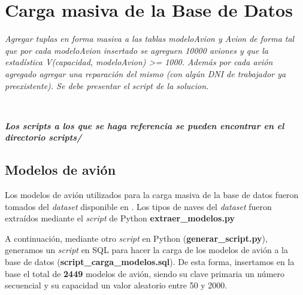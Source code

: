 







\clearpage
\tableofcontents
\clearpage


\section{Carga masiva de la Base de Datos}

\emph{Agregar tuplas en forma masiva a las tablas modeloAvion y Avion de forma tal que por cada modeloAvion insertado se agreguen 10000 aviones y que la estadística V(capacidad, modeloAvion) >= 1000. Además por cada avión agregado agregar una reparación del mismo (con algún DNI de trabajador ya preexistente). Se debe presentar el script de la solucion.} 

~

\emph{\textbf{Los scripts a los que se haga referencia se pueden encontrar en el directorio scripts/}} 

\subsection{Modelos de avión}

Los modelos de avión utilizados para la carga masiva de la base de datos fueron tomados del \emph{dataset} disponible en \cite{dataset:2013}. Los tipos de naves del \emph{dataset} fueron extraídos mediante el \emph{script} de Python \textbf{extraer\_modelos.py}

A continuación, mediante otro \emph{script} en Python (\textbf{generar\_script.py}), generamos un \emph{script} en SQL para hacer la carga de los modelos de avión a la base de datos (\textbf{script\_carga\_modelos.sql}). De esta forma, insertamos en la base el total de \textbf{2449} modelos de avión, siendo su clave primaria un número secuencial y su capacidad un valor aleatorio entre 50 y 2000. 


